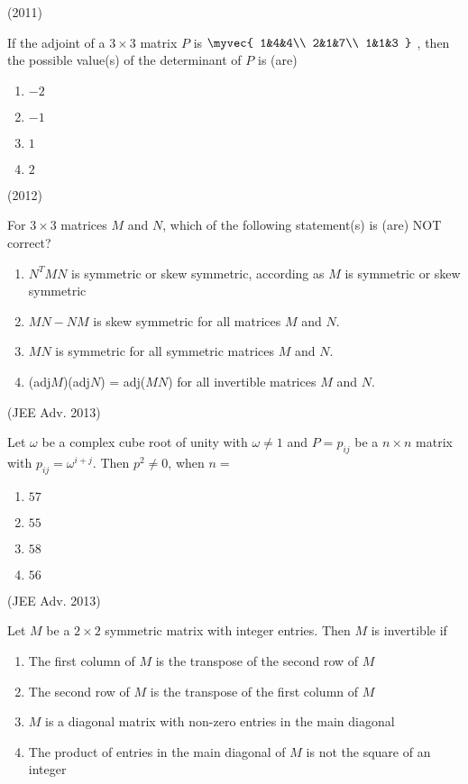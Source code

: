         \hfill (2011)
    \item 
        If the adjoint of a $3 \times 3$ matrix $P$ is 
                $\myvec{	
                    1&4&4\\
                    2&1&7\\
                    1&1&3
                }$
        , then the possible value(s) of the determinant of $P$ is (are)
            \begin{enumerate}
                \item $-2$
                \item $-1$
                \item $1$
                \item $2$
            \end{enumerate}
            \hfill (2012)
    \item 
        For $3 \times 3$ matrices $M$ and $N$, which of the following statement(s) is (are) NOT correct?
            \begin{enumerate}
                \item $N^TMN$ is symmetric or skew symmetric, according as $M$ is symmetric or skew symmetric
                \item $MN-NM$ is skew symmetric for all matrices $M$ and $N$.
                \item $MN$ is symmetric for all symmetric matrices $M$ and $N$.
                \item (adj$M$)(adj$N$) = adj($MN$) for all invertible matrices $M$ and $N$.
            \end{enumerate}
            \hfill (JEE Adv. 2013)
    \item 
        Let $\omega$ be a complex cube root of unity with $\omega \neq 1 $ and $P={p_{ij}}$ be a $n \times n$ matrix with $p_{ij} = \omega^{i+j}$. Then $p^2 \neq 0$, when $n=$
        \begin{enumerate}
            \item $57$
            \item $55$
            \item $58$
            \item $56$
        \end{enumerate}
        \hfill (JEE Adv. 2013)
    \item 
        Let $M$ be a $2 \times 2$ symmetric matrix with integer entries. Then $M$ is invertible if
            \begin{enumerate}
                \item The first column of $M$ is the transpose of the second row of $M$
                \item The second row of $M$ is the transpose of the first column of $M$
                \item $M$ is a diagonal matrix with non-zero entries in the main diagonal
                \item The product of entries in the main diagonal of $M$ is not the square of an integer
            \end{enumerate}
